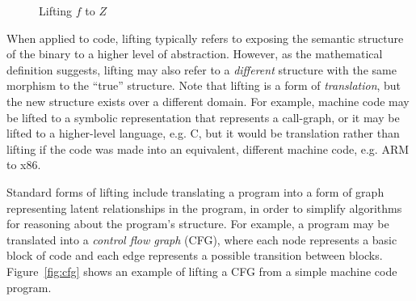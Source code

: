 \begin{figure}[h]
\centering
{}
\caption{Lifting $f$ to $Z$}
\label{fig:lift}
\end{figure}

When applied to code, lifting typically refers to exposing the semantic structure of the binary to a higher level of abstraction.
However, as the mathematical definition suggests, lifting may also refer to a \emph{different} structure with the same morphism to the ``true'' structure.
Note that lifting is a form of \emph{translation}, but the new structure exists over a different domain.
For example, machine code may be lifted to a symbolic representation that represents a call-graph, or it may be lifted to a higher-level language, e.g. C, but it would be translation rather than lifting if the code was made into an equivalent, different machine code, e.g. ARM to x86.

Standard forms of lifting include translating a program into a form of graph representing latent relationships in the program, in order to simplify algorithms for reasoning about the program's structure.
For example, a program may be translated into a \emph{control flow graph} (CFG), where each node represents a basic block of code and each edge represents a possible transition between blocks.
Figure~\ref{fig:cfg} shows an example of lifting a CFG from a simple machine code program.

